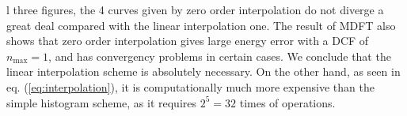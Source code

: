 l three figures, the 4 curves given by zero order interpolation
do not diverge a great deal compared with the linear interpolation one. The
result of MDFT also shows that zero order interpolation gives large
energy error with a DCF of $n_{\max}=1$, and has convergency problems
in certain cases. We conclude that the linear interpolation scheme
is absolutely necessary. On the other hand, as seen in eq. (\ref{eq:interpolation}),
it is computationally much more expensive than the simple histogram
scheme, as it requires $2^{5}=32$ times of operations.
